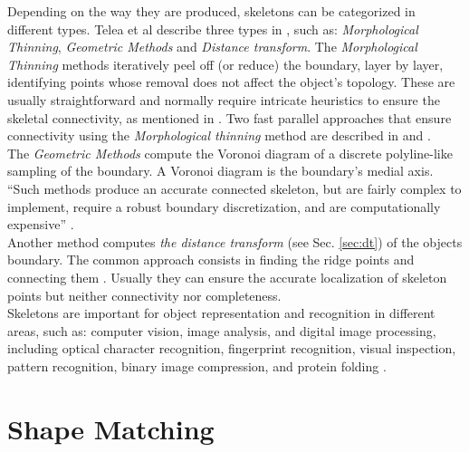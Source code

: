 Depending on the way they are produced, skeletons can be categorized in different types.
Telea et al describe three types in \cite{augmented}, such as: \emph{Morphological Thinning},
\emph{Geometric Methods} and \emph{Distance transform}. The \emph{Morphological Thinning} methods iteratively peel off (or reduce) the boundary, layer by layer, identifying
points whose removal does not affect the object's topology. These are usually 
straightforward and normally require intricate heuristics to ensure the skeletal
connectivity, as mentioned in \cite{augmented}. Two fast parallel approaches that
ensure connectivity using the \emph{Morphological thinning} method are described
in \cite{onepass} and \cite{thinning}.\\
The \emph{Geometric Methods} compute the Voronoi diagram of a discrete polyline-like
sampling of the boundary. A Voronoi diagram is the boundary's medial axis. ``Such 
methods produce an accurate connected skeleton, but are fairly complex to implement,
require a robust boundary discretization, and are computationally expensive''
\cite[p.251]{augmented}.\\
Another method computes \emph{the distance transform}
(see Sec. \ref{sec:dt}) of the objects boundary. The common approach consists in
finding the ridge points and connecting them \cite{maxima,euclideancentre,ridgedt}.
 Usually they can ensure the accurate localization of skeleton points 
but neither connectivity nor completeness.\\

Skeletons are important for object representation and recognition in different areas,
such as: computer vision, image analysis, and digital image processing, 
including optical character recognition, fingerprint recognition, visual inspection,
pattern recognition, binary image compression, and protein folding \cite{skprotein}.


\section{Shape Matching}
\label{sec:shapefitting}

